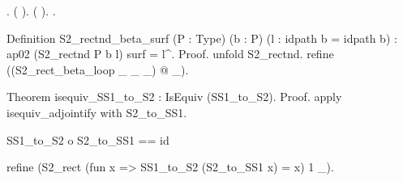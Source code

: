 \begin{coqdoccode}
\coqdocindent{1.00em}
 .  (\coqdocvar{\_}  \coqdocnotation{(} \coqdocvar{\_}\coqdocnotation{)\^{}}).\coqdoceol
\coqdocindent{1.00em}
 (\coqdocvar{\_}  \coqdocnotation{(} \coqdocvar{\_}\coqdocnotation{)}).\coqdoceol
\coqdocnoindent
{}.\coqdoceol
\coqdocemptyline
\coqdocnoindent
\begin{coqdoccomment}
\coqdoceol
Definition\coqdocindent{0.50em}
S2\_rectnd\_beta\_surf\coqdocindent{0.50em}
(P\coqdocindent{0.50em}
:\coqdocindent{0.50em}
Type)\coqdocindent{0.50em}
(b\coqdocindent{0.50em}
:\coqdocindent{0.50em}
P)\coqdocindent{0.50em}
(l\coqdocindent{0.50em}
:\coqdocindent{0.50em}
idpath\coqdocindent{0.50em}
b\coqdocindent{0.50em}
=\coqdocindent{0.50em}
idpath\coqdocindent{0.50em}
b)\coqdoceol
:\coqdocindent{0.50em}
ap02\coqdocindent{0.50em}
(S2\_rectnd\coqdocindent{0.50em}
P\coqdocindent{0.50em}
b\coqdocindent{0.50em}
l)\coqdocindent{0.50em}
surf\coqdocindent{0.50em}
=\coqdocindent{0.50em}
l\^{}.\coqdoceol
Proof.\coqdoceol
\coqdocindent{1.00em}
unfold\coqdocindent{0.50em}
S2\_rectnd.\coqdoceol
\coqdocindent{1.00em}
refine\coqdocindent{0.50em}
((S2\_rect\_beta\_loop\coqdocindent{0.50em}
\_\coqdocindent{0.50em}
\_\coqdocindent{0.50em}
\_)\coqdocindent{0.50em}
@\coqdocindent{0.50em}
\_).\coqdoceol
\end{coqdoccomment}
\coqdoceol
\coqdocemptyline
\coqdocnoindent
\begin{coqdoccomment}
\coqdoceol
Theorem\coqdocindent{0.50em}
isequiv\_SS1\_to\_S2\coqdocindent{0.50em}
:\coqdocindent{0.50em}
IsEquiv\coqdocindent{0.50em}
(SS1\_to\_S2).\coqdoceol
Proof.\coqdoceol
\coqdocindent{1.00em}
apply\coqdocindent{0.50em}
isequiv\_adjointify\coqdocindent{0.50em}
with\coqdocindent{0.50em}
S2\_to\_SS1.\coqdoceol
\coqdocindent{1.00em}
\coqdoceol
\coqdocindent{1.00em}
\begin{coqdoccomment}
\coqdocindent{0.50em}
SS1\_to\_S2\coqdocindent{0.50em}
o\coqdocindent{0.50em}
S2\_to\_SS1\coqdocindent{0.50em}
==\coqdocindent{0.50em}
id\coqdocindent{0.50em}
\end{coqdoccomment}
\coqdoceol
\coqdocindent{1.00em}
refine\coqdocindent{0.50em}
(S2\_rect\coqdocindent{0.50em}
(fun\coqdocindent{0.50em}
x\coqdocindent{0.50em}
=>\coqdocindent{0.50em}
SS1\_to\_S2\coqdocindent{0.50em}
(S2\_to\_SS1\coqdocindent{0.50em}
x)\coqdocindent{0.50em}
=\coqdocindent{0.50em}
x)\coqdocindent{0.50em}
1\coqdocindent{0.50em}
\_).\coqdoceol
\coqdocindent{1.00em}

\end{coqdoccomment}
\end{coqdoccode}
